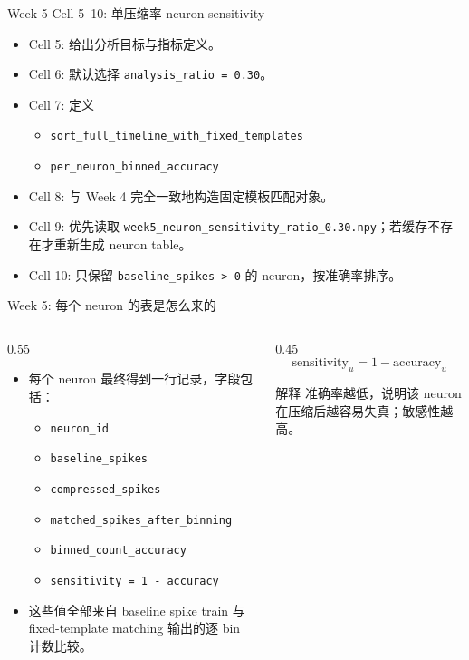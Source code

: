 \documentclass[aspectratio=169,11pt]{beamer}
\begin{document}
\begin{frame}{Week 5 Cell 5--10: 单压缩率 neuron sensitivity}
  \begin{itemize}
    \item Cell 5: 给出分析目标与指标定义。
    \item Cell 6: 默认选择 \texttt{analysis\_ratio = 0.30}。
    \item Cell 7: 定义
    \begin{itemize}
      \item \texttt{sort\_full\_timeline\_with\_fixed\_templates}
      \item \texttt{per\_neuron\_binned\_accuracy}
    \end{itemize}
    \item Cell 8: 与 Week 4 完全一致地构造固定模板匹配对象。
    \item Cell 9: 优先读取 \texttt{week5\_neuron\_sensitivity\_ratio\_0.30.npy}；若缓存不存在才重新生成 neuron table。
    \item Cell 10: 只保留 \texttt{baseline\_spikes > 0} 的 neuron，按准确率排序。
  \end{itemize}
\end{frame}

\begin{frame}{Week 5: 每个 neuron 的表是怎么来的}
  \small
  \begin{columns}[T]
    \begin{column}{0.55\textwidth}
      \begin{itemize}
        \item 每个 neuron 最终得到一行记录，字段包括：
        \begin{itemize}
          \item \texttt{neuron\_id}
          \item \texttt{baseline\_spikes}
          \item \texttt{compressed\_spikes}
          \item \texttt{matched\_spikes\_after\_binning}
          \item \texttt{binned\_count\_accuracy}
          \item \texttt{sensitivity = 1 - accuracy}
        \end{itemize}
        \item 这些值全部来自 baseline spike train 与 fixed-template matching 输出的逐 bin 计数比较。
      \end{itemize}
    \end{column}
    \begin{column}{0.45\textwidth}
      \[
        \text{sensitivity}_u = 1 - \text{accuracy}_u
      \]
      \vspace{0.5em}
      \begin{block}{解释}
        准确率越低，说明该 neuron 在压缩后越容易失真；敏感性越高。
      \end{block}
    \end{column}
  \end{columns}
\end{frame}
\end{document}
